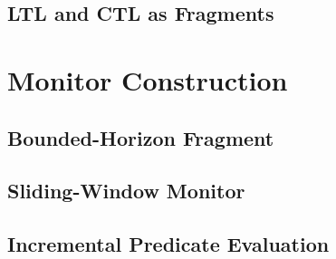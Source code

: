 \documentclass[runningheads]{llncs}
\begin{document}
\subsection{LTL and CTL as Fragments}

\section{Monitor Construction}
\label{sec:monitor}

\subsection{Bounded-Horizon Fragment}

\subsection{Sliding-Window Monitor}

\subsection{Incremental Predicate Evaluation}
\end{document}
